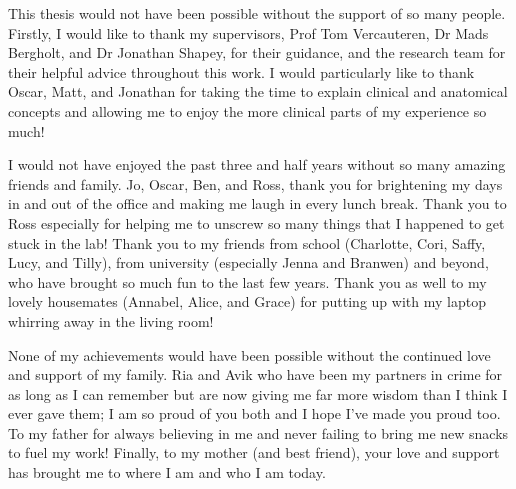 This thesis would not have been possible without the support of so many people. Firstly, I would like to thank my supervisors, Prof Tom Vercauteren, Dr Mads Bergholt, and Dr Jonathan Shapey, for their guidance, and the research team for their helpful advice throughout this work. I would particularly like to thank Oscar, Matt, and Jonathan for taking the time to explain clinical and anatomical concepts and allowing me to enjoy the more clinical parts of my experience so much! 

I would not have enjoyed the past three and half years without so many amazing friends and family. Jo, Oscar, Ben, and Ross, thank you for brightening my days in and out of the office and making me laugh in every lunch break. Thank you to Ross especially for helping me to unscrew so many things that I happened to get stuck in the lab! Thank you to my friends from school (Charlotte, Cori, Saffy, Lucy, and Tilly), from university (especially Jenna and Branwen) and beyond, who have brought so much fun to the last few years. Thank you as well to my lovely housemates (Annabel, Alice, and Grace) for putting up with my laptop whirring away in the living room!

None of my achievements would have been possible without the continued love and support of my family. Ria and Avik who have been my partners in crime for as long as I can remember but are now giving me far more wisdom than I think I ever gave them; I am so proud of you both and I hope I’ve made you proud too. To my father for always believing in me and never failing to bring me new snacks to fuel my work! Finally, to my mother (and best friend), your love and support has brought me to where I am and who I am today. 
